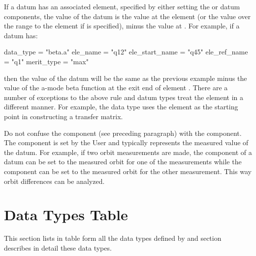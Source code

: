 If a datum has an associated  element, specified by either setting the
 or  datum components, the  value of the datum is the
value at the  element (or the value over the range  to the
 element if  is specified), minus the  value at
. For example, if a datum has:
\begin{example}
  data_type      = "beta.a"
  ele_name       = "q12"
  ele_start_name = "q45"
  ele_ref_name   = "q1"
  merit_type     = "max"
\end{example}
then the  value of the datum will be the same as the previous example minus the value of
the a-mode beta function at the exit end of element . There are a number of exceptions to the
above rule and datum types treat the  element in a different manner. For example, the
 data type uses the  element as the starting point in constructing a transfer
matrix.

Do not confuse the  component (see preceding paragraph) with the 
component. The  component is set by the User and typically represents the measured value of
the datum. For example, if two orbit measurements are made, the  component of a datum can
be set to the measured orbit for one of the measurements while the  component can be set to
the measured orbit for the other measurement. This way orbit differences can be analyzed.

\section{Data Types Table}
\label{s:data.table}

This section lists in table form all the data types defined by \tao and section~
describes in detail these data types.


